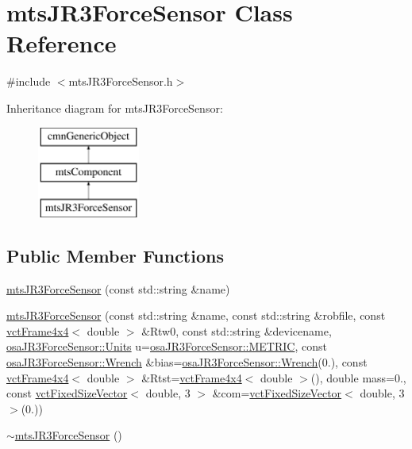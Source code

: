\hypertarget{classmts_j_r3_force_sensor}{\section{mts\-J\-R3\-Force\-Sensor Class Reference}
\label{classmts_j_r3_force_sensor}
}


{\ttfamily \#include $<$mts\-J\-R3\-Force\-Sensor.\-h$>$}

Inheritance diagram for mts\-J\-R3\-Force\-Sensor\-:\begin{figure}[H]
\begin{center}
\leavevmode
\includegraphics[height=3.000000cm]{de/d2c/classmts_j_r3_force_sensor}
\end{center}
\end{figure}
\subsection*{Public Member Functions}
\begin{DoxyCompactItemize}
\item 
\hyperlink{classmts_j_r3_force_sensor_ae258b22c0f978ad9295a2188459db1b3}{mts\-J\-R3\-Force\-Sensor} (const std\-::string \&name)
\item 
\hyperlink{classmts_j_r3_force_sensor_a236dcb35f8862f9a3080cbf7880438e0}{mts\-J\-R3\-Force\-Sensor} (const std\-::string \&name, const std\-::string \&robfile, const \hyperlink{classvct_frame4x4}{vct\-Frame4x4}$<$ double $>$ \&Rtw0, const std\-::string \&devicename, \hyperlink{classosa_j_r3_force_sensor_ac94f1969d4d2089487b912dd0ef7592f}{osa\-J\-R3\-Force\-Sensor\-::\-Units} u=\hyperlink{classosa_j_r3_force_sensor_ac94f1969d4d2089487b912dd0ef7592faf9d1cb83e02904b93520796fff2d9161}{osa\-J\-R3\-Force\-Sensor\-::\-M\-E\-T\-R\-I\-C}, const \hyperlink{classosa_j_r3_force_sensor_afcfc2ba175b2e7ef9f86c6394c8966d2}{osa\-J\-R3\-Force\-Sensor\-::\-Wrench} \&bias=\hyperlink{classosa_j_r3_force_sensor_afcfc2ba175b2e7ef9f86c6394c8966d2}{osa\-J\-R3\-Force\-Sensor\-::\-Wrench}(0.), const \hyperlink{classvct_frame4x4}{vct\-Frame4x4}$<$ double $>$ \&Rtst=\hyperlink{classvct_frame4x4}{vct\-Frame4x4}$<$ double $>$(), double mass=0., const \hyperlink{classvct_fixed_size_vector}{vct\-Fixed\-Size\-Vector}$<$ double, 3 $>$ \&com=\hyperlink{classvct_fixed_size_vector}{vct\-Fixed\-Size\-Vector}$<$ double, 3 $>$(0.))
\item 
\hyperlink{classmts_j_r3_force_sensor_a0b979e1bc6364ded1902aae4fccf4a99}{$\sim$mts\-J\-R3\-Force\-Sensor} ()
\end{DoxyCompactItemize}
